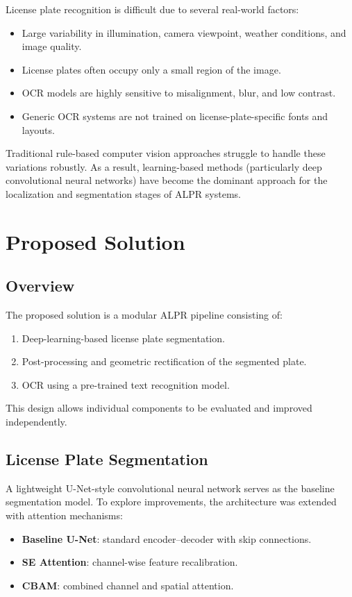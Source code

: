 \documentclass[11pt,a4paper]{article}
\begin{document}
License plate recognition is difficult due to several real-world factors:
\begin{itemize}
    \item Large variability in illumination, camera viewpoint, weather conditions, and image quality.
    \item License plates often occupy only a small region of the image.
    \item OCR models are highly sensitive to misalignment, blur, and low contrast.
    \item Generic OCR systems are not trained on license-plate-specific fonts and layouts.
\end{itemize}

Traditional rule-based computer vision approaches struggle to handle these
variations robustly. As a result, learning-based methods (particularly deep
convolutional neural networks) have become the dominant approach for the
localization and segmentation stages of ALPR systems.

\section{Proposed Solution}

\subsection{Overview}

The proposed solution is a modular ALPR pipeline consisting of:
\begin{enumerate}
    \item Deep-learning-based license plate segmentation.
    \item Post-processing and geometric rectification of the segmented plate.
    \item OCR using a pre-trained text recognition model.
\end{enumerate}

This design allows individual components to be evaluated and improved independently.

\subsection{License Plate Segmentation}

A lightweight U-Net-style convolutional neural network serves as the baseline segmentation model. To explore improvements, the architecture was extended with attention mechanisms:
\begin{itemize}
    \item \textbf{Baseline U-Net}: standard encoder--decoder with skip connections.
    \item \textbf{SE Attention}: channel-wise feature recalibration.
    \item \textbf{CBAM}: combined channel and spatial attention.
\end{itemize}
\end{document}
